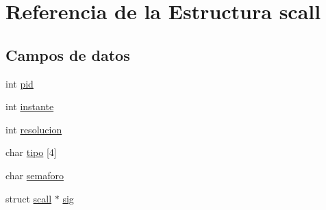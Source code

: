 \hypertarget{structscall}{\section{Referencia de la Estructura scall}
\label{structscall}
}
\subsection*{Campos de datos}
\begin{DoxyCompactItemize}
\item 
int \hyperlink{structscall_ab6a91a0001e173df71ec9262b306e852}{pid}
\item 
int \hyperlink{structscall_a708ccbd2b58716d77b5dd6a1adabeea2}{instante}
\item 
int \hyperlink{structscall_a5d5553c85657a4e8df8abee86a4817c0}{resolucion}
\item 
char \hyperlink{structscall_a9f0b743b3846fe946abd6414035f91fb}{tipo} \mbox{[}4\mbox{]}
\item 
char \hyperlink{structscall_a67d17d647822c49caaad2f4b1953f2cd}{semaforo}
\item 
struct \hyperlink{structscall}{scall} $\ast$ \hyperlink{structscall_a7cce9b2960d49fc5047b164943a17849}{sig}
\end{DoxyCompactItemize}


